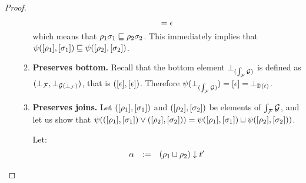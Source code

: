 \begin{proof}
\begin{enumerate}
\begin{enumerate}
\[      = \epsilon
    \]
    which means that $\rho_1\sigma_1 \sqsubseteq \rho_2\sigma_2$.
    This immediately implies that
    $\psi({[\rho_1]},{[\sigma_1]}) \sqsubseteq \psi({[\rho_2]},{[\sigma_2]})$.
  \item {\bf Preserves bottom.}
    Recall that the bottom element $\bot_{(\int_{\mathcal{F}}{\mathcal{G}})}$
    is defined as $(\bot_{\mathcal{F}}, \bot_{\mathcal{G}(\bot_{\mathcal{F}})})$, that is
    $({[\epsilon]}, {[\epsilon]})$.
    Therefore $\psi(\bot_{(\int_{\mathcal{F}}{\mathcal{G}})}) = {[\epsilon]} = \bot_{\mathbb{D}(t)}$.
  \item {\bf Preserves joins.}
    Let $({[\rho_1]},{[\sigma_1]})$ and $({[\rho_2]},{[\sigma_2]})$
    be elements of $\int_{\mathcal{F}}{\mathcal{G}}$, and let us show that
    $\psi(({[\rho_1]},{[\sigma_1]}) \lor ({[\rho_2]},{[\sigma_2]})) =
     \psi({[\rho_1]},{[\sigma_1]}) \sqcup \psi({[\rho_2]},{[\sigma_2]}))$.

    Let:
    \[
    \begin{array}{rcl}
      \alpha & := & (\rho_1 \sqcup \rho_2) \downarrow t'
    \end{array}
    \]


\end{enumerate}
\end{enumerate}
\end{proof}
